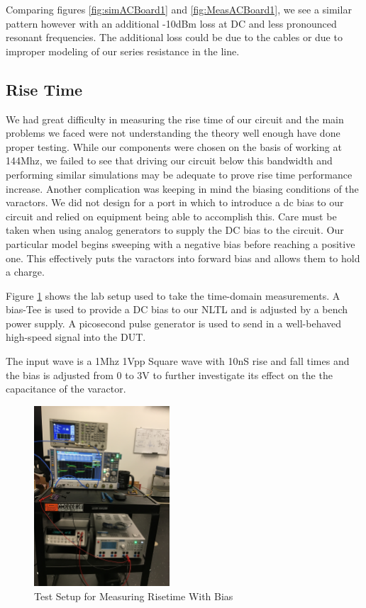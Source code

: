 \documentclass[journal]{IEEEtran} \usepackage[english]{babel}
\begin{document}
Comparing figures \ref{fig:simACBoard1} and \ref{fig:MeasACBoard1}, we see a
similar pattern however with an additional -10dBm loss at DC and less pronounced
resonant frequencies. The additional loss could be due to the cables or due to
improper modeling of our series resistance in the line. 


\subsection{Rise Time}\label{RiseTimeMeasResults}

We had great difficulty in measuring the rise time of our circuit and the main
problems we faced were not understanding the theory well enough have done proper
testing. While our components were chosen on the basis of working at 144Mhz, we
failed to see that driving our circuit below this bandwidth and performing
similar simulations may be adequate to prove rise time performance increase.
Another complication was keeping in mind the biasing conditions of the
varactors. We did not design for a port in which to introduce a dc bias to our
circuit and relied on equipment being able to accomplish this. Care must be
taken when using analog generators to supply the DC bias to the circuit. Our
particular model begins sweeping with a negative bias before reaching a positive
one. This effectively puts the varactors into forward bias and allows them to
hold a charge.



Figure \ref{fig:SetupWBiasing} shows the lab setup used to take the time-domain
measurements. A bias-Tee is used to provide a DC bias to our NLTL and is
adjusted by a bench power supply. A picosecond pulse generator is used to send
in a well-behaved high-speed signal into the DUT.

The input wave is a 1Mhz 1Vpp Square wave with 10nS rise and fall times and the
bias is adjusted from 0 to 3V to further investigate its effect on the
the capacitance of the varactor.

\begin{figure}[htb]
\centering
\includegraphics[width=0.45\textwidth,angle = -90]{SetupWithBiasing.JPG}
\caption{Test Setup for Measuring Risetime With Bias}
\label{fig:SetupWBiasing}
\end{figure}
\end{document}
